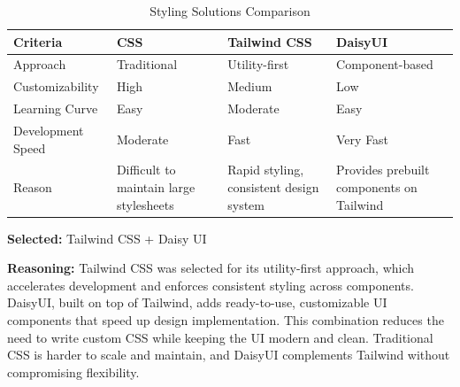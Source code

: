 \begin{table}[H]
\centering
\caption{Styling Solutions Comparison}
\begin{tabular}{|l|p{4cm}|p{4cm}|p{4cm}|}
\hline
\textbf{Criteria}       & \textbf{CSS}               & \textbf{Tailwind CSS}        & \textbf{DaisyUI}             \\
\hline
Approach                & Traditional                & Utility-first                & Component-based              \\
Customizability         & High                       & Medium                      & Low                         \\
Learning Curve          & Easy                       & Moderate                    & Easy                        \\
Development Speed       & Moderate                   & Fast                        & Very Fast                   \\
Reason                  & Difficult to maintain large stylesheets & Rapid styling, consistent design system & Provides prebuilt components on Tailwind \\
\hline
\end{tabular}
\label{tab:styling-solutions-comparison}
\end{table}

\textbf{Selected:} Tailwind CSS + Daisy UI \par
\textbf{Reasoning:} Tailwind CSS was selected for its utility-first approach, which accelerates development and enforces consistent styling across components. DaisyUI, built on top of Tailwind, adds ready-to-use, customizable UI components that speed up design implementation. This combination reduces the need to write custom CSS while keeping the UI modern and clean. Traditional CSS is harder to scale and maintain, and DaisyUI complements Tailwind without compromising flexibility.

\vspace{2em}

